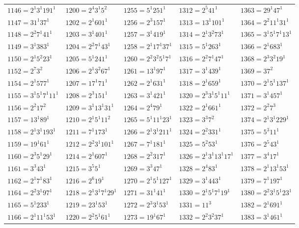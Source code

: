 {\begin{longtable}[c]{*{5}{l}}
$1146=2^{1}3^{1}191^{1}$&$1200=2^{4}3^{1}5^{2}$&$1255=5^{1}251^{1}$&$1312=2^{5}41^{1}$&$1363=29^{1}47^{1}$\\
$1147=31^{1}37^{1}$&$1202=2^{1}601^{1}$&$1256=2^{3}157^{1}$&$1313=13^{1}101^{1}$&$1364=2^{2}11^{1}31^{1}$\\
$1148=2^{2}7^{1}41^{1}$&$1203=3^{1}401^{1}$&$1257=3^{1}419^{1}$&$1314=2^{1}3^{2}73^{1}$&$1365=3^{1}5^{1}7^{1}13^{1}$\\
$1149=3^{1}383^{1}$&$1204=2^{2}7^{1}43^{1}$&$1258=2^{1}17^{1}37^{1}$&$1315=5^{1}263^{1}$&$1366=2^{1}683^{1}$\\
$1150=2^{1}5^{2}23^{1}$&$1205=5^{1}241^{1}$&$1260=2^{2}3^{2}5^{1}7^{1}$&$1316=2^{2}7^{1}47^{1}$&$1368=2^{3}3^{2}19^{1}$\\
$1152=2^{7}3^{2}$&$1206=2^{1}3^{2}67^{1}$&$1261=13^{1}97^{1}$&$1317=3^{1}439^{1}$&$1369=37^{2}$\\
$1154=2^{1}577^{1}$&$1207=17^{1}71^{1}$&$1262=2^{1}631^{1}$&$1318=2^{1}659^{1}$&$1370=2^{1}5^{1}137^{1}$\\
$1155=3^{1}5^{1}7^{1}11^{1}$&$1208=2^{3}151^{1}$&$1263=3^{1}421^{1}$&$1320=2^{3}3^{1}5^{1}11^{1}$&$1371=3^{1}457^{1}$\\
$1156=2^{2}17^{2}$&$1209=3^{1}13^{1}31^{1}$&$1264=2^{4}79^{1}$&$1322=2^{1}661^{1}$&$1372=2^{2}7^{3}$\\
$1157=13^{1}89^{1}$&$1210=2^{1}5^{1}11^{2}$&$1265=5^{1}11^{1}23^{1}$&$1323=3^{3}7^{2}$&$1374=2^{1}3^{1}229^{1}$\\
$1158=2^{1}3^{1}193^{1}$&$1211=7^{1}173^{1}$&$1266=2^{1}3^{1}211^{1}$&$1324=2^{2}331^{1}$&$1375=5^{3}11^{1}$\\
$1159=19^{1}61^{1}$&$1212=2^{2}3^{1}101^{1}$&$1267=7^{1}181^{1}$&$1325=5^{2}53^{1}$&$1376=2^{5}43^{1}$\\
$1160=2^{3}5^{1}29^{1}$&$1214=2^{1}607^{1}$&$1268=2^{2}317^{1}$&$1326=2^{1}3^{1}13^{1}17^{1}$&$1377=3^{4}17^{1}$\\
$1161=3^{3}43^{1}$&$1215=3^{5}5^{1}$&$1269=3^{3}47^{1}$&$1328=2^{4}83^{1}$&$1378=2^{1}13^{1}53^{1}$\\
$1162=2^{1}7^{1}83^{1}$&$1216=2^{6}19^{1}$&$1270=2^{1}5^{1}127^{1}$&$1329=3^{1}443^{1}$&$1379=7^{1}197^{1}$\\
$1164=2^{2}3^{1}97^{1}$&$1218=2^{1}3^{1}7^{1}29^{1}$&$1271=31^{1}41^{1}$&$1330=2^{1}5^{1}7^{1}19^{1}$&$1380=2^{2}3^{1}5^{1}23^{1}$\\
$1165=5^{1}233^{1}$&$1219=23^{1}53^{1}$&$1272=2^{3}3^{1}53^{1}$&$1331=11^{3}$&$1382=2^{1}691^{1}$\\
$1166=2^{1}11^{1}53^{1}$&$1220=2^{2}5^{1}61^{1}$&$1273=19^{1}67^{1}$&$1332=2^{2}3^{2}37^{1}$&$1383=3^{1}461^{1}$\\

\end{longtable}}
